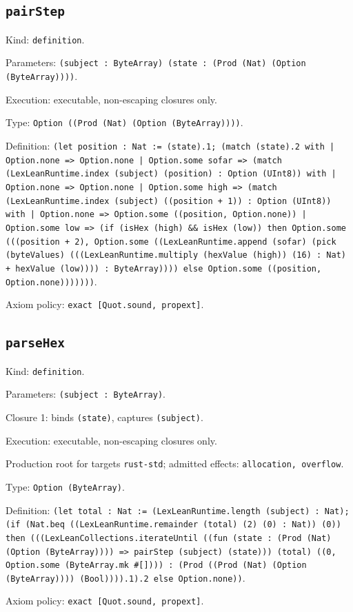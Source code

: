 \documentclass[11pt]{article}
\begin{document}
\subsection*{\texttt{pairStep}}
\noindent Kind: \texttt{definition}.\par
\noindent Parameters: \texttt{(subject : ByteArray) (state : (Prod (Nat) (Option (ByteArray))))}.\par
\noindent Execution: executable, non-escaping closures only.\par
\noindent Type: \texttt{Option ((Prod (Nat) (Option (ByteArray))))}.\par
\noindent Definition: \texttt{(let position : Nat := (state).1; (match (state).2 with | Option.none => Option.none | Option.some sofar => (match (LexLeanRuntime.index (subject) (position) : Option (UInt8)) with | Option.none => Option.none | Option.some high => (match (LexLeanRuntime.index (subject) ((position + 1)) : Option (UInt8)) with | Option.none => Option.some ((position, Option.none)) | Option.some low => (if (isHex (high) \&\& isHex (low)) then Option.some (((position + 2), Option.some ((LexLeanRuntime.append (sofar) (pick (byteValues) (((LexLeanRuntime.multiply (hexValue (high)) (16) : Nat) + hexValue (low)))) : ByteArray)))) else Option.some ((position, Option.none)))))))}.\par
\noindent Axiom policy: \texttt{exact [Quot.sound, propext]}.\par
\subsection*{\texttt{parseHex}}
\noindent Kind: \texttt{definition}.\par
\noindent Parameters: \texttt{(subject : ByteArray)}.\par
\noindent Closure 1: binds \texttt{(state)}, captures \texttt{(subject)}.\par
\noindent Execution: executable, non-escaping closures only.\par
\noindent Production root for targets \texttt{rust-std}; admitted effects: \texttt{allocation, overflow}.\par
\noindent Type: \texttt{Option (ByteArray)}.\par
\noindent Definition: \texttt{(let total : Nat := (LexLeanRuntime.length (subject) : Nat); (if (Nat.beq ((LexLeanRuntime.remainder (total) (2) (0) : Nat)) (0)) then (((LexLeanCollections.iterateUntil ((fun (state : (Prod (Nat) (Option (ByteArray)))) => pairStep (subject) (state))) (total) ((0, Option.some (ByteArray.mk \#[]))) : (Prod ((Prod (Nat) (Option (ByteArray)))) (Bool)))).1).2 else Option.none))}.\par
\noindent Axiom policy: \texttt{exact [Quot.sound, propext]}.\par
\end{document}
